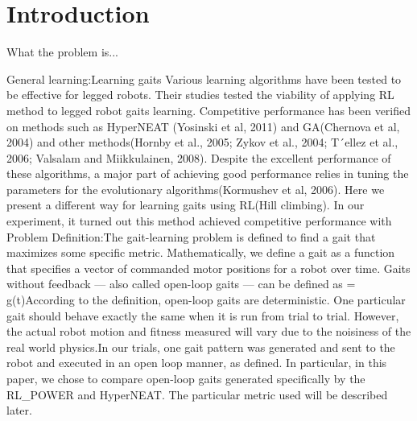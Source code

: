 \section{Introduction}

What the problem is...


General learning:Learning gaits Various learning algorithms have been tested to be effective for legged robots. Their studies tested the viability of applying RL method to legged robot gaits learning. Competitive performance has been verified on methods such as HyperNEAT (Yosinski et al, 2011) and GA(Chernova et al, 2004) and other  methods(Hornby et al., 2005; Zykov et al., 2004; T´ellez et al., 2006; Valsalam and Miikkulainen, 2008). Despite the excellent performance of these algorithms, a major part of achieving good performance relies in tuning the parameters for the evolutionary algorithms(Kormushev et al, 2006). Here we present a different way for learning gaits using RL(Hill climbing). In our experiment, it turned out this method achieved competitive performance with Problem Definition:The gait-learning problem is defined to find a gait that maximizes some specific metric. Mathematically, we define a gait as a function that specifies a vector of commanded motor positions for a robot over time. Gaits without feedback --- also called open-loop gaits --- can be defined as \be{} = g(t)\ee According to the definition, open-loop gaits are deterministic. One particular gait should behave exactly the same when it is run from trial to trial. However, the actual robot motion and fitness measured will vary due to the noisiness of the real world physics.In our trials, one gait pattern was generated and sent to the robot and executed in an open loop manner, as defined. In particular, in this paper, we chose to compare open-loop gaits generated specifically by the RL\_POWER and HyperNEAT. The particular metric used will be described later.
